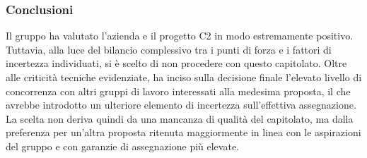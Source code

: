 \subsubsection{Conclusioni}
Il gruppo ha valutato l'azienda e il progetto C2 in modo estremamente positivo. Tuttavia, alla luce del bilancio complessivo tra i punti di forza e i fattori di incertezza individuati, si è scelto di non procedere con questo capitolato. Oltre alle criticità tecniche evidenziate, ha inciso sulla decisione finale l'elevato livello di concorrenza con altri gruppi di lavoro interessati alla medesima proposta, il che avrebbe introdotto un ulteriore elemento di incertezza sull'effettiva assegnazione. La scelta non deriva quindi da una mancanza di qualità del capitolato, ma dalla preferenza per un'altra proposta ritenuta maggiormente in linea con le aspirazioni del gruppo e con garanzie di assegnazione più elevate.